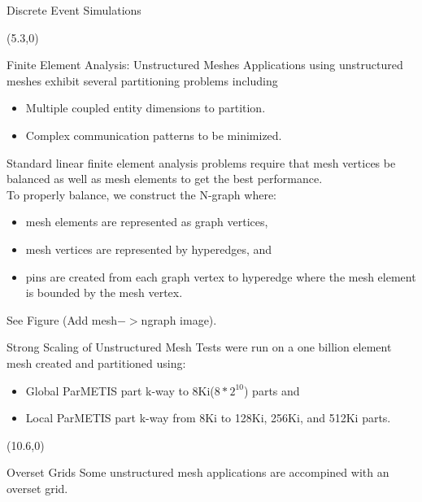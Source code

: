 \documentclass{beamer}
\begin{document}
\begin{textblock}{15.6}
\begin{textblock}{5}
\begin{block}{Discrete Event Simulations}
    \end{block}
  \end{textblock}
  \begin{textblock}{5}(5.3,0)
    \begin{block}{Finite Element Analysis: Unstructured Meshes}
      Applications using unstructured meshes exhibit several partitioning problems including
      \begin{itemize}
      \item Multiple coupled entity dimensions to partition.
      \item Complex communication patterns to be minimized.
      \end{itemize}
      Standard linear finite element analysis problems require that mesh vertices be balanced as well as mesh elements to get the best performance.\\
      To properly balance, we construct the N-graph where:
      \begin{itemize}
      \item mesh elements are represented as graph vertices,
      \item mesh vertices are represented by hyperedges, and
      \item pins are created from each graph vertex to hyperedge where the mesh element is bounded by the mesh vertex.
      \end{itemize}
      See Figure (Add mesh$->$ngraph image).

    \end{block}
    \begin{block}{Strong Scaling of Unstructured Mesh}
      Tests were run on a one billion element mesh created and partitioned using:
      \begin{itemize}
      \item Global ParMETIS part k-way to 8Ki($8*2^{10}$) parts and
      \item Local ParMETIS part k-way from 8Ki to 128Ki, 256Ki, and 512Ki parts.
      \end{itemize}

    \end{block}
  \end{textblock}
  \begin{textblock}{5}(10.6,0)
    \begin{block}{Overset Grids}
      Some unstructured mesh applications are accompined with an overset grid.


\end{block}
\end{textblock}
\end{textblock}
\end{document}
